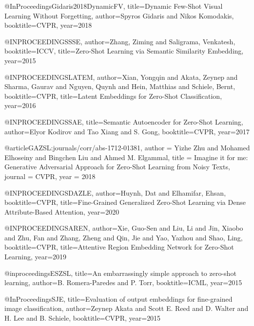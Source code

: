 @InProceedings{Gidaris2018DynamicFV,
  title={Dynamic Few-Shot Visual Learning Without Forgetting},
  author={Spyros Gidaris and Nikos Komodakis},
  booktitle={CVPR},
  year={2018}}




@INPROCEEDINGS{SSE,  author={Zhang, Ziming and Saligrama, Venkatesh},  booktitle={ICCV},   title={Zero-Shot Learning via Semantic Similarity Embedding},   year={2015}}



@INPROCEEDINGS{LATEM,
author={Xian, Yongqin and Akata, Zeynep and Sharma, Gaurav and Nguyen, Quynh and Hein, Matthias and Schiele, Bernt},  booktitle={CVPR},   title={Latent Embeddings for Zero-Shot Classification},   year={2016}}




@INPROCEEDINGS{SAE,
  title={Semantic Autoencoder for Zero-Shot Learning},
  author={Elyor Kodirov and Tao Xiang and S. Gong},
  booktitle={CVPR},
  year={2017}
}



@article{GAZSL:journals/corr/abs-1712-01381,
  author    = {Yizhe Zhu and
               Mohamed Elhoseiny and
               Bingchen Liu and
               Ahmed M. Elgammal},
  title     = {Imagine it for me: Generative Adversarial Approach for Zero-Shot Learning from Noisy Texts},
  journal   = {CVPR},
  year      = {2018}
}



@INPROCEEDINGS{DAZLE,  author={Huynh, Dat and Elhamifar, Ehsan},  booktitle={CVPR},   title={Fine-Grained Generalized Zero-Shot Learning via Dense Attribute-Based Attention},   year={2020}}




@INPROCEEDINGS{AREN,  author={Xie, Guo-Sen and Liu, Li and Jin, Xiaobo and Zhu, Fan and Zhang, Zheng and Qin, Jie and Yao, Yazhou and Shao, Ling},  booktitle={CVPR},   title={Attentive Region Embedding Network for Zero-Shot Learning},   year={2019}}



@inproceedings{ESZSL,
  title={An embarrassingly simple approach to zero-shot learning},
  author={B. Romera-Paredes and P. Torr},
  booktitle={ICML},
  year={2015}
}




@InProceedings{SJE,
  title={Evaluation of output embeddings for fine-grained image classification},
  author={Zeynep Akata and Scott E. Reed and D. Walter and H. Lee and B. Schiele},
  booktitle={CVPR},
  year={2015}
}



